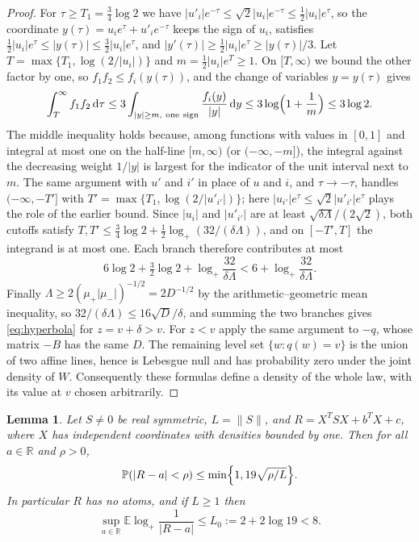 \documentclass[11pt]{amsart}
\numberwithin{equation}{section}
\newtheorem{lemma}[theorem]{Lemma}
\theoremstyle{definition}
\theoremstyle{remark}
\newcommand{\R}{\mathbb R}
\newcommand{\E}{\mathbb E}
\newcommand{\PP}{\mathbb P}
\newcommand{\1}{\mathbf 1}
\newcommand{\dd}{\,\mathrm d}
\newcommand{\logp}{\log_+}
\newcommand{\norm}[1]{\lVert #1\rVert}
\newcommand{\abs}[1]{\lvert #1\rvert}
\begin{document}
\begin{proof}
For $\tau\ge T_1=\frac34\log2$ we have $\abs{u'_i}e^{-\tau}\le\sqrt2\abs{u_i}e^{-\tau}\le\frac12\abs{u_i}e^\tau$, so the coordinate $y(\tau)=u_ie^\tau+u'_ie^{-\tau}$ keeps the sign of $u_i$, satisfies $\frac12\abs{u_i}e^\tau\le\abs{y(\tau)}\le\frac32\abs{u_i}e^\tau$, and $\abs{y'(\tau)}\ge\frac12\abs{u_i}e^\tau\ge\abs{y(\tau)}/3$. Let $T=\max\{T_1,\log(2/\abs{u_i})\}$ and $m=\frac12\abs{u_i}e^T\ge1$. On $[T,\infty)$ we bound the other factor by one, so $f_1f_2\le f_i(y(\tau))$, and the change of variables $y=y(\tau)$ gives
\[
\int_T^\infty f_1f_2\dd\tau\le3\int_{\abs y\ge m,\ \mathrm{one\ sign}}\frac{f_i(y)}{\abs y}\dd y\le3\log\Bigl(1+\frac1m\Bigr)\le3\log2 .
\]
The middle inequality holds because, among functions with values in $[0,1]$ and integral at most one on the half-line $[m,\infty)$ (or $(-\infty,-m]$), the integral against the decreasing weight $1/\abs y$ is largest for the indicator of the unit interval next to $m$. The same argument with $u'$ and $i'$ in place of $u$ and $i$, and $\tau\to-\tau$, handles $(-\infty,-T']$ with $T'=\max\{T_1,\log(2/\abs{u'_{i'}})\}$; here $\abs{u_{i'}}e^{\tau}\le\sqrt2\abs{u'_{i'}}e^{\tau}$ plays the role of the earlier bound. Since $\abs{u_i}$ and $\abs{u'_{i'}}$ are at least $\sqrt{\delta\Lambda}/(2\sqrt2)$, both cutoffs satisfy $T,T'\le\frac34\log2+\frac12\logp(32/(\delta\Lambda))$, and on $[-T',T]$ the integrand is at most one. Each branch therefore contributes at most
\[
6\log2+\tfrac32\log2+\logp\frac{32}{\delta\Lambda}<6+\logp\frac{32}{\delta\Lambda}.
\]
Finally $\Lambda\ge2(\mu_+\abs{\mu_-})^{-1/2}=2D^{-1/2}$ by the arithmetic--geometric mean inequality, so $32/(\delta\Lambda)\le16\sqrt D/\delta$, and summing the two branches gives \eqref{eq:hyperbola} for $z=v+\delta>v$. For $z<v$ apply the same argument to $-q$, whose matrix $-B$ has the same $D$. The remaining level set $\{w:q(w)=v\}$ is the union of two affine lines, hence is Lebesgue null and has probability zero under the joint density of $W$. Consequently these formulas define a density of the whole law, with its value at $v$ chosen arbitrarily.
\end{proof}

\begin{lemma}\label{lem:concentration}
Let $S\ne0$ be real symmetric, $L=\norm S$, and $R=X^TSX+b^TX+c$, where $X$ has independent coordinates with densities bounded by one. Then for all $a\in\R$ and $\rho>0$,
\begin{equation}\label{eq:concentration}
\PP(\abs{R-a}<\rho)\le\min\Bigl\{1,19\sqrt{\rho/L}\Bigr\}.
\end{equation}
In particular $R$ has no atoms, and if $L\ge1$ then
\begin{equation}\label{eq:logmoment}
\sup_{a\in\R}\E\logp\frac1{\abs{R-a}}\le L_0:=2+2\log19<8 .
\end{equation}
\end{lemma}
\end{document}
